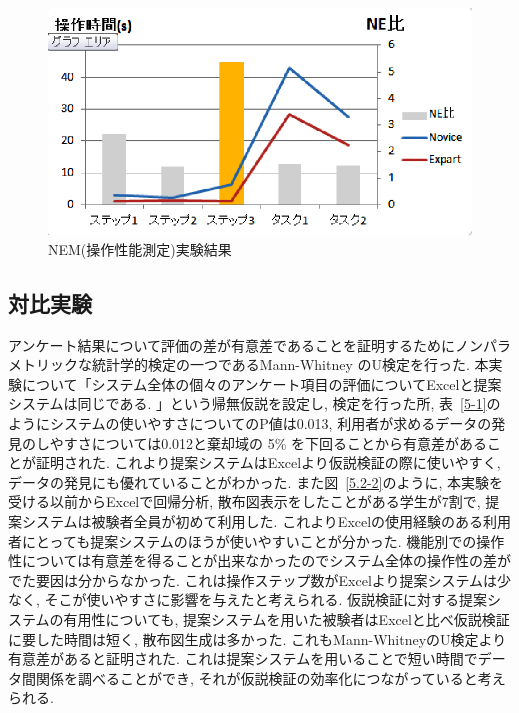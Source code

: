 \documentclass[sotsuron]{kuee}
\begin{document}
\begin{figure}
  \begin{center}
    \unitlength=1mm
   \includegraphics[width=120mm]{fig5-1.eps}
  \end{center}
  \caption{NEM(操作性能測定)実験結果}
  \label{5.2-1}
\end{figure}

\subsection{対比実験}

アンケート結果について評価の差が有意差であることを証明するためにノンパラメトリックな統計学的検定の一つであるMann-Whitney
\cite{5.2.2-1}のU検定を行った.
本実験について「システム全体の個々のアンケート項目の評価についてExcelと提案システムは同じである. 」という帰無仮説を設定し, 検定を行った所,
表~\ref{5-1}のようにシステムの使いやすさについてのP値は0.013, 利用者が求めるデータの発見のしやすさについては0.012と棄却域の
5\%
を下回ることから有意差があることが証明された. これより提案システムはExcelより仮説検証の際に使いやすく, データの発見にも優れていることがわかった.
また図~\ref{5.2-2}のように, 本実験を受ける以前からExcelで回帰分析, 散布図表示をしたことがある学生が7割で, 提案システムは被験者全員が初めて利用した.
これよりExcelの使用経験のある利用者にとっても提案システムのほうが使いやすいことが分かった.
機能別での操作性については有意差を得ることが出来なかったのでシステム全体の操作性の差がでた要因は分からなかった.
これは操作ステップ数がExcelより提案システムは少なく, そこが使いやすさに影響を与えたと考えられる.
仮説検証に対する提案システムの有用性についても, 提案システムを用いた被験者はExcelと比べ仮説検証に要した時間は短く, 散布図生成は多かった.
これもMann-WhitneyのU検定より有意差があると証明された.
これは提案システムを用いることで短い時間でデータ間関係を調べることができ, それが仮説検証の効率化につながっていると考えられる.
\end{document}
